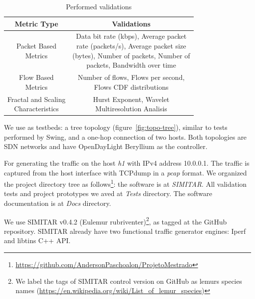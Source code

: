 \begin{table}
	\centering
	\caption{Performed validations}
		\begin{tabular}{c c}
			\toprule
			\textbf{Metric Type} & \textbf{Validations} \\
			\midrule
			\makecell{Packet Based \\Metrics}                & \makecell{Data bit rate (kbps), Average packet\\
				rate (packets/s), Average packet size\\
				(bytes), Number of packets, Number of\\
				packets, Bandwidth over time}\\
			
			\makecell{Flow Based \\ Metrics}                & \makecell{Number of flows, Flows per second, \\
				Flows CDF distributions}\\
			
			\makecell{Fractal and Scaling \\ Characteristics} & \makecell{Hurst Exponent, Wavelet \\
				Multiresolution Analisis}\\
			\bottomrule
		\end{tabular}
	\label{tab:validation-tests-performed}
\end{table}


We use as testbeds: a tree topology (figure~\ref{fig:topo-tree}), similar to tests performed by Swing\cite{swing-paper}\cite{background-traffic-matter}\cite{legotg-paper}, and a one-hop connection of two hosts. Both topologies are SDN networks and have OpenDayLight Beryllium as the controller.

For generating the traffic on the host \textit{h1} with IPv4 address 10.0.0.1. The traffic is captured from the host interface with TCPdump in a \textit{pcap} format.  We organized the project directory tree as follows\footnote{ \href{https://github.com/AndersonPaschoalon/ProjetoMestrado}{https://github.com/AndersonPaschoalon/ProjetoMestrado} }: the software is at \textit{SIMITAR}. All validation tests and project prototypes we aved at \textit{Tests} directory. The software documentation is at \textit{Docs} directory.

We use SIMITAR v0.4.2 (Eulemur rubriventer)\footnote{ We label the tags of SIMITAR control version on GitHub as lemurs species names (\href{https://en.wikipedia.org/wiki/List_of_lemur_species}{https://en.wikipedia.org/wiki/List\_of\_lemur\_species})}, as tagged at the GitHub repository.  SIMITAR already have two functional traffic generator engines: Iperf and libtins C++ API.  

